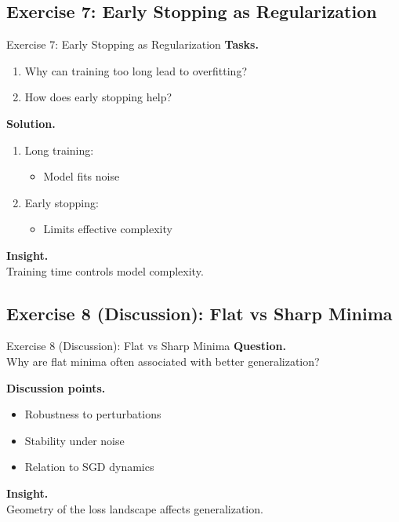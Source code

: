 \documentclass[aspectratio=169,11pt]{beamer}
\begin{document}
\subsection{Exercise 7: Early Stopping as Regularization}
\begin{frame}[t,allowframebreaks]{Exercise 7: Early Stopping as Regularization}
\small
\textbf{Tasks.}\\ \begin{enumerate}
    \item Why can training too long lead to overfitting?
    \item How does early stopping help?
\end{enumerate}

\textbf{Solution.}\\ \begin{enumerate}
\item Long training:
\begin{itemize}
    \item Model fits noise
\end{itemize}

\item Early stopping:
\begin{itemize}
    \item Limits effective complexity
\end{itemize}
\end{enumerate}

\textbf{Insight.}\\ Training time controls model complexity.
\end{frame}

\subsection{Exercise 8 (Discussion): Flat vs Sharp Minima}
\begin{frame}[t,allowframebreaks]{Exercise 8 (Discussion): Flat vs Sharp Minima}
\small
\textbf{Question.}\\ Why are flat minima often associated with better generalization?

\textbf{Discussion points.}\\ \begin{itemize}
    \item Robustness to perturbations
    \item Stability under noise
    \item Relation to SGD dynamics
\end{itemize}

\textbf{Insight.}\\ Geometry of the loss landscape affects generalization.
\end{frame}
\end{document}
